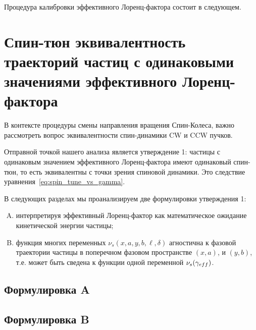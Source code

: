 Процедура калибровки эффективного Лоренц-фактора состоит в следующем.



\section{Спин-тюн эквивалентность траекторий частиц с одинаковыми значениями эффективного Лоренц-фактора}\label{sec:spin_tune_traj_equivalence}
В контексте процедуры смены направления вращения Спин-Колеса, важно рассмотреть вопрос эквивалентности спин-динамики CW и CCW пучков. 

Отправной точкой нашего анализа является утверждение 1: частицы с одинаковым значением эффективного Лоренц-фактора имеют одинаковый спин-тюн, то есть эквивалентны с точки зрения спиновой динамики. Это следствие уравнения~\eqref{eq:spin_tune_vs_gamma}.

В следующих разделах мы проанализируем две формулировки утверждения 1:
\begin{enumerate}[A.]
	\item интерпретируя эффективный Лоренц-фактор как математическое ожидание кинетической энергии частицы;
	\item функция многих переменных $\nu_s(x, a, y, b, \ell, \delta)$ агностична к фазовой траектории частицы в поперечном фазовом пространстве $(x,a)$, и $(y,b)$, т.е. может быть сведена к функции одной переменной $\nu_s(\g*)$.
\end{enumerate}

\subsection{Формулировка A}


\subsection{Формулировка B}\label{sec:spin_stune_traj_equ:B_form}


\clearpage
